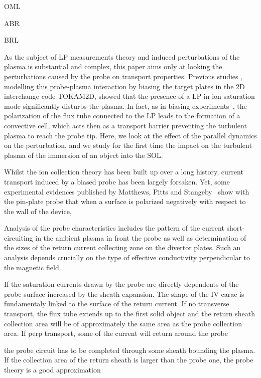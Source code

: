 \documentclass[cpp,a4paper,fleqn,twoside%
]{w-art}
\begin{document}
OML\cite{Mott-Smith26}

ABR\cite{Allen57}

BRL\cite{Bernstein59,Laframboise66}


As the subject of LP measurements theory and induced perturbations of the plasma
is substantial and complex, this paper aims only at looking the perturbations
caused by the probe on transport properties. Previous studies ,
modelling this probe-plasma interaction by biasing the target plates in the 2D
interchange code TOKAM2D, showed that the presence of a
LP in ion saturation mode significantly disturbs the plasma. In fact, as
in biasing experiments~\cite{Zweben09}, the polarization of the flux tube
connected to the LP leads to the formation of a convective cell, which acts
then as a transport barrier preventing the turbulent plasma to reach the probe
tip. Here, we look at the effect of the parallel dynamics on the perturbation, 
and we study for the first time the impact on the turbulent plasma of the 
immersion of an object into the SOL.

Whilst the ion collection theory has been built up over a long history,
current transport induced by a biased probe has been largely forsaken. 
Yet, some experimental evidences published by Matthews, Pitts and
Stangeby~\cite{Matthews89,Pitts90,Stangeby95-2} show with the pin-plate 
probe that when a surface is polarized negatively with respect to the 
wall of the device,

Analysis of the probe characteristics includes the
pattern of the current short-circuiting in the ambient plasma in front  
the probe as well as determination of the sizes of the return current 
collecting zone on the divertor plates. Such an analysis depends 
crucially on the type of effective conductivity perpendicular to the 
magnetic field.

If the saturation currents drawn by the probe are directly dependents 
of the probe surface increased by the sheath expansion. The shape of 
the IV carac is fundamentaly linked to the surface of the return 
current. If no transverse transport, the flux tube extends up to the 
first solid object and the return sheath
collection area will be of approximately the same area as the probe 
collection area. If perp transport, some of the current will return 
around the probe 

the probe circuit has to be completed through some sheath 
bounding the plasma. If the collection area of the return sheath is 
larger than the probe one, the probe theory is a good approximation
\end{document}
